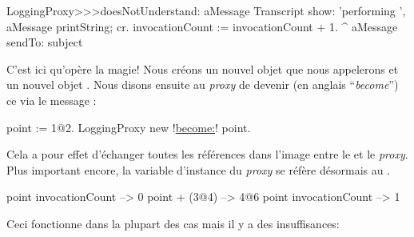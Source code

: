 \documentclass[a4paper,10pt,twoside]{book}
\begin{document}
\begin{code}{}
LoggingProxy>>>doesNotUnderstand: aMessage 
	Transcript show: 'performing ', aMessage printString; cr.
	invocationCount := invocationCount + 1.
	^ aMessage sendTo: subject
\end{code}

C'est ici qu'opère la magie!
Nous créons un nouvel objet  que nous appelerons  et un nouvel objet . Nous disons ensuite au \emph{proxy} de devenir (en anglais ``\emph{become}'') ce  via le message \mbox{:}
\begin{code}{}
point := 1@2.
LoggingProxy new !\underline{become:}! point.
\end{code}

Cela a pour effet d'échanger toutes les références dans l'image entre le  et le \emph{proxy}. 
Plus important encore, la variable d'instance  du \emph{proxy} se réfère désormais au .

\begin{code}{}
point invocationCount --> 0
point + (3@4)             --> 4@6
point invocationCount --> 1
\end{code}

\noindent{} Ceci fonctionne dans la plupart des cas mais il y a des insuffisances:
\end{document}
